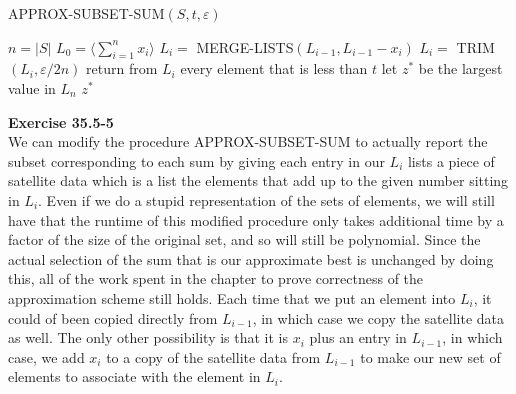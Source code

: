 \documentclass{article}
\begin{document}
\begin{algorithm}
\caption{APPROX-SUBSET-SUM$(S,t,\varepsilon)$}
\begin{algorithmic}[1]
\State $n=|S|$
\State $L_0 = \langle \sum_{i=1}^n x_i \rangle$
	\State $L_i = $ MERGE-LISTS$(L_{i-1}, L_{i-1}-x_i)$
	\State $L_i = $ TRIM$(L_i, \varepsilon/2n)$
	\State return from $L_i$ every element that is less than $t$
\EndFor
\State let $z^*$ be the largest value in $L_n$
\State \Return $z^*$
\end{algorithmic}
\end{algorithm}

\noindent\textbf{Exercise 35.5-5}\\

We can modify the procedure APPROX-SUBSET-SUM to actually report the subset corresponding to each sum by giving each entry in our $L_i$ lists a piece of satellite data which is a list the elements that add up to the given number sitting in $L_i$. Even if we do a stupid representation of the sets of elements, we will still have that the runtime of this modified procedure only takes additional time by a factor of the size of the original set, and so will still be polynomial. Since the actual selection of the sum that is our approximate best is unchanged by doing this, all of the work spent in the chapter to prove correctness of the approximation scheme still holds. Each time that we put an element into $L_i$, it could of been copied directly from $L_{i-1}$, in which case we copy the satellite data as well. The only other possibility is that it is $x_i$ plus an entry in $L_{i-1}$, in which case, we add $x_i$ to a copy of the satellite data from $L_{i-1}$ to make our new set of elements to associate with the element in $L_i$.\\
\end{document}
